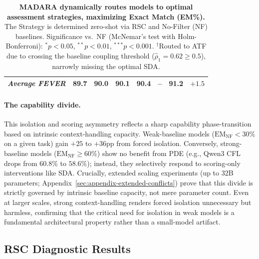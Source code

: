 \documentclass[11pt]{article}
\theoremstyle{definition}
\begin{document}
\begin{table}[t]
{\begin{tabular}{@{}ll cc cccc | ccc@{}}
\multicolumn{4}{l}{\textit{Average FEVER}} & 89.7 & 90.0 & 90.1 & 90.4 & -- & \textbf{91.2} & \(+1.5\) \\
\bottomrule
\end{tabular}
}
\caption{\textbf{MADARA dynamically routes models to optimal assessment strategies, maximizing Exact Match (EM\%).} The Strategy is determined zero-shot via RSC and No-Filter (NF) baselines. Significance vs.\ NF (McNemar's test with Holm-Bonferroni): \texorpdfstring{\(^{*}p{<}0.05\)}{* p<0.05}, \texorpdfstring{\(^{**}p{<}0.01\)}{** p<0.01}, \texorpdfstring{\(^{***}p{<}0.001\)}{*** p<0.001}. \texorpdfstring{\(^\dagger\)}{dagger}Routed to ATF due to crossing the baseline coupling threshold (\(\hat{\rho}_1 = 0.62 \ge 0.5\)), narrowly missing the optimal SDA.}
\label{tab:main-results}
\end{table}



\paragraph{The capability divide.}
This isolation and scoring asymmetry reflects a sharp capability phase-transition based on intrinsic context-handling capacity. Weak-baseline models (\(\text{EM}_{\text{NF}} < 30\%\) on a given task) gain \(+25\) to \(+36\)pp from forced isolation. Conversely, strong-baseline models (\(\text{EM}_{\text{NF}} \geq 60\%\)) show no benefit from PDE (e.g., Qwen3 CFL drops from \(60.8\%\) to \(58.6\%\)); instead, they selectively respond to scoring-only interventions like SDA. Crucially, extended scaling experiments (up to 32B parameters; Appendix~\ref{sec:appendix-extended-conflicts}) prove that this divide is strictly governed by intrinsic baseline capacity, not mere parameter count. Even at larger scales, strong context-handling renders forced isolation unnecessary but harmless, confirming that the critical need for isolation in weak models is a fundamental architectural property rather than a small-model artifact.


\subsection{RSC Diagnostic Results}
\label{subsec:finding-rsc}
\end{document}
